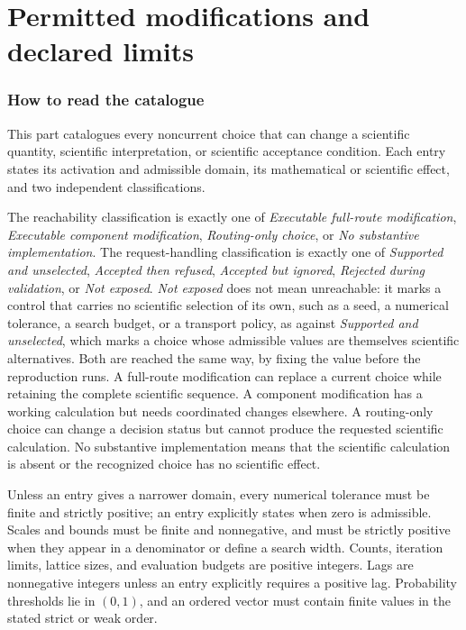 \documentclass[11pt]{article}
\begin{document}
\part{Permitted modifications and declared limits}

\section{How to read the catalogue}

This part catalogues every noncurrent choice that can change a scientific quantity, scientific
interpretation, or scientific acceptance condition. Each entry states its activation and admissible domain,
its mathematical or scientific effect, and two independent classifications.

The reachability classification is exactly one of \emph{Executable full-route modification},
\emph{Executable component modification}, \emph{Routing-only choice}, or
\emph{No substantive implementation}. The request-handling classification is exactly one of
\emph{Supported and unselected}, \emph{Accepted then refused}, \emph{Accepted but ignored},
\emph{Rejected during validation}, or \emph{Not exposed}. \emph{Not exposed} does not mean
unreachable: it marks a control that carries no scientific selection of its own, such as a seed, a
numerical tolerance, a search budget, or a transport policy, as against \emph{Supported and
unselected}, which marks a choice whose admissible values are themselves scientific alternatives.
Both are reached the same way, by fixing the value before the reproduction runs. A full-route modification can replace a
current choice while retaining the complete scientific sequence. A component modification has a
working calculation but needs coordinated changes elsewhere. A routing-only choice can change a
decision status but cannot produce the requested scientific calculation. No substantive
implementation means that the scientific calculation is absent or the recognized choice has no
scientific effect.

Unless an entry gives a narrower domain, every numerical tolerance must be finite and strictly
positive; an entry explicitly states when zero is admissible. Scales and bounds must be finite and
nonnegative, and must be strictly positive when they appear in a denominator or define a search
width. Counts, iteration limits, lattice sizes, and evaluation budgets are positive integers. Lags
are nonnegative integers unless an entry explicitly requires a positive lag. Probability thresholds lie in \((0,1)\),
and an ordered vector must contain finite values in the stated strict or weak order.
\end{document}
